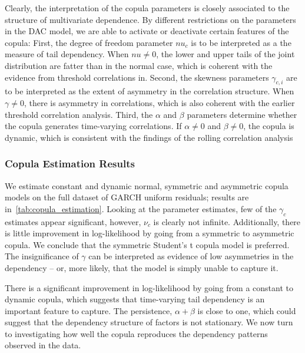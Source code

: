 Clearly, the interpretation of the copula parameters is closely associated to the structure of multivariate dependence. By different restrictions on the parameters in the DAC model, we are able to activate or deactivate certain features of the copula: First, the degree of freedom parameter $nu_c$ is to be interpreted as a the measure of tail dependency. When $nu \neq 0$, the lower and upper tails of the joint distribution are fatter than in the normal case, which is coherent with the evidence from threshold correlations in. Second, the skewness parameters $\gamma_{c,i}$ are to be interpreted as the extent of asymmetry in the correlation structure. When $\gamma \neq 0$, there is asymmetry in correlations, which is also coherent with the earlier threshold correlation analysis. Third, the $\alpha$ and $\beta$ parameters determine whether the copula generates time-varying correlations. If $\alpha \neq 0$ and $\beta \neq 0$, the copula is dynamic, which is consistent with the findings of the rolling correlation analysis

\subsubsection{Copula Estimation Results}

We estimate constant and dynamic normal, symmetric and asymmetric copula models on the full dataset of GARCH uniform residuals; results are in~\autoref{tab:copula_estimation}. Looking at the parameter estimates, few of the $\gamma_c$ estimates appear significant, however, $\nu_c$ is clearly not infinite. Additionally, there is little improvement in log-likelihood by going from a symmetric to asymmetric copula. We conclude that the symmetric Student's t copula model is preferred. The insignificance of $\gamma$ can be interpreted as evidence of low asymmetries in the dependency -- or, more likely, that the model is simply unable to capture it.

There is a significant improvement in log-likelihood by going from a constant to dynamic copula, which suggests that time-varying tail dependency is an important feature to capture. The persistence, $\alpha + \beta$ is close to one, which could suggest that the dependency structure of factors is not stationary. We now turn to investigating how well the copula reproduces the dependency patterns observed in the data.





